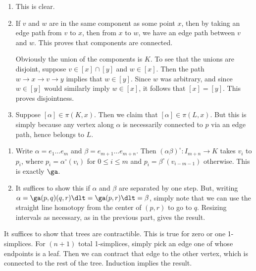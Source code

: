 \documentclass[../../solutions.tex]{subfiles}
\begin{document}
\begin{exercise} \leavevmode
\begin{enumerate}
\item
This is clear.

\item
If $v$ and $w$ are in the same component as some point $x$, then by taking an edge path from $v$ to $x$, then from $x$ to $w$, we have an edge path between $v$ and $w$.
This proves that components are connected.

Obviously the union of the components is $K$.
To see that the unions are disjoint, suppose $v\in[x]\cap[y]$ and $w\in[x]$.
Then the path $w\to x\to v\to y$ implies that $w\in[y]$.
Since $w$ was arbitrary, and since $w\in[y]$ would similarly imply $w\in[x]$, it follows that $[x]=[y]$.
This proves disjointness.

\item
Suppose $[\alpha]\in\pi(K,x)$.
Then we claim that $[\alpha]\in\pi(L,x)$.
But this is simply because any vertex along $\alpha$ is necessarily connected to $p$ via an edge path, hence belongs to $L$.
\end{enumerate}
\end{exercise}

\begin{exercise} \leavevmode
\begin{enumerate}
\item
Write $\alpha=e_1\dots e_m$ and $\beta=e_{m+1}\dots e_{m+n}$.
Then $(\alpha\beta)^\circ:I_{m+n}\to K$ takes $v_i$ to $p_i$, where $p_i=\alpha^\circ(v_i)$ for $0\le i\le m$ and $p_i=\beta^\circ(v_{i-m-1})$ otherwise.
This is exactly $\ga$.

\item
It suffices to show this if $\alpha$ and $\beta$ are separated by one step.
But, writing $\alpha=\ga(p,q)(q,r)\dlt=\ga(p,r)\dlt=\beta$, simply note that we can use the straight line homotopy from the center of $(p,r)$ to go to $q$.
Resizing intervals as necessary, as in the previous part, gives the result.
\end{enumerate}
\end{exercise}

\begin{exercise} \leavevmode
It suffices to show that trees are contractible.
This is true for zero or one 1-simplices.
For $(n+1)$ total 1-simplices, simply pick an edge one of whose endpoints is a leaf.
Then we can contract that edge to the other vertex, which is connected to the rest of the tree.
Induction implies the result.
\end{exercise}
\end{document}
